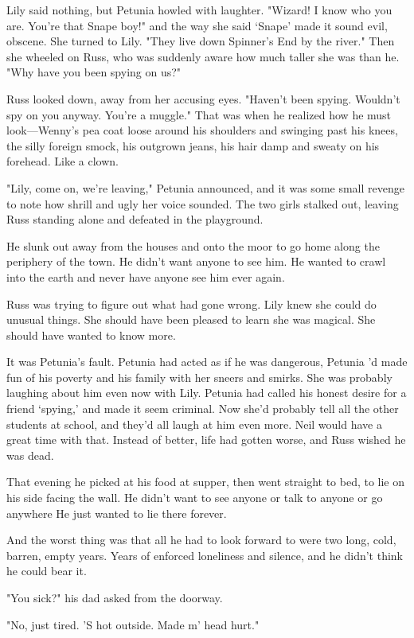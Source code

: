Lily said nothing, but Petunia howled with laughter. "Wizard! I know who you are. You're that Snape boy!" and the way she said `Snape' made it sound evil, obscene. She turned to Lily. "They live down Spinner's End by the river." Then she wheeled on Russ, who was suddenly aware how much taller she was than he. "Why have you been spying on us?"

Russ looked down, away from her accusing eyes. "Haven't been{\el} spying. Wouldn't{\el} spy on you anyway. You're a{\el} muggle." That was when he realized how he must look—Wenny's pea coat loose around his shoulders and swinging past his knees, the silly foreign smock, his outgrown jeans, his hair damp and sweaty on his forehead. Like a clown.

"Lily, come on, we're leaving," Petunia announced, and it was some small revenge to note how shrill and ugly her voice sounded. The two girls stalked out, leaving Russ standing alone and defeated in the playground.

He slunk out away from the houses and onto the moor to go home along the periphery of the town. He didn't want anyone to see him. He wanted to crawl into the earth and never have anyone see him ever again.

Russ was trying to figure out what had gone wrong. Lily knew she could do unusual things. She should have been pleased to learn she was magical. She should have wanted to know more.

It was Petunia's fault. Petunia had acted as if he was dangerous, Petunia 'd made fun of his poverty and his family with her sneers and smirks. She was probably laughing about him even now with Lily. Petunia had called his honest desire for a friend `spying,' and made it seem criminal. Now she'd probably tell all the other students at school, and they'd all laugh at him even more. Neil would have a great time with that. Instead of better, life had gotten worse, and Russ wished he was dead.

That evening he picked at his food at supper, then went straight to bed, to lie on his side facing the wall. He didn't want to see anyone or talk to anyone or go anywhere{\el} He just wanted to lie there forever.

And the worst thing was that all he had to look forward to were two long, cold, barren, empty years. Years of enforced loneliness and silence, and he didn't think he could bear it.

"You sick?" his dad asked from the doorway.

"No, just tired. 'S hot outside. Made m' head hurt."

